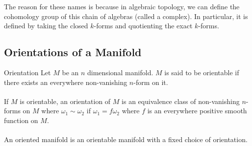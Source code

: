 \documentclass[a4paper]{article}
\begin{document}
The reason for these names is because in algebraic topology, we can define the cohomology group of this chain of algebras (called a complex). In particular, it is defined by taking the closed $k$-forms and quotienting the exact $k$-forms. 

\subsection{Orientations of a Manifold}
\begin{defn}{Orientation}{} Let $M$ be an $n$ dimensional manifold. $M$ is said to be orientable if there exists an everywhere non-vanishing $n$-form on it. \\~\\
If $M$ is orientable, an orientation of $M$ is an equivalence class of non-vanishing $n$-forms on $M$ where $\omega_1\sim\omega_2$ if $\omega_1=f\omega_2$ where $f$ is an everywhere positive smooth function on $M$. \\~\\
An oriented manifold is an orientable manifold with a fixed choice of orientation. 
\end{defn}
\end{document}
